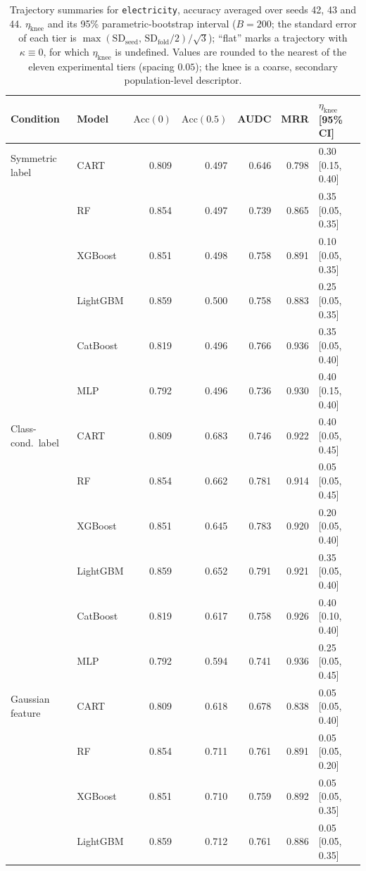 \begin{table}[p]
\centering
\scriptsize
\setlength{\tabcolsep}{3.5pt}
\caption{Trajectory summaries for \texttt{electricity}, accuracy averaged over seeds 42, 43 and 44. $\eta_{\mathrm{knee}}$ and its 95\% parametric-bootstrap interval ($B=200$; the standard error of each tier is $\max(\mathrm{SD}_{\mathrm{seed}},\,\mathrm{SD}_{\mathrm{fold}}/2)/\sqrt3$); ``flat'' marks a trajectory with $\kappa\equiv 0$, for which $\eta_{\mathrm{knee}}$ is undefined. Values are rounded to the nearest of the eleven experimental tiers (spacing $0.05$); the knee is a coarse, secondary population-level descriptor.}
\label{tab:traj_electricity}
\begin{tabular}{@{}llrrrrl@{}}
\toprule
Condition & Model & $\mathrm{Acc}(0)$ & $\mathrm{Acc}(0.5)$ & AUDC & MRR & $\eta_{\mathrm{knee}}$ [95\% CI] \\
\midrule
Symmetric label & CART & 0.809 & 0.497 & 0.646 & 0.798 & 0.30 [0.15, 0.40] \\
 & RF & 0.854 & 0.497 & 0.739 & 0.865 & 0.35 [0.05, 0.35] \\
 & XGBoost & 0.851 & 0.498 & 0.758 & 0.891 & 0.10 [0.05, 0.35] \\
 & LightGBM & 0.859 & 0.500 & 0.758 & 0.883 & 0.25 [0.05, 0.35] \\
 & CatBoost & 0.819 & 0.496 & 0.766 & 0.936 & 0.35 [0.05, 0.40] \\
 & MLP & 0.792 & 0.496 & 0.736 & 0.930 & 0.40 [0.15, 0.40] \\
\midrule
Class-cond.\ label & CART & 0.809 & 0.683 & 0.746 & 0.922 & 0.40 [0.05, 0.45] \\
 & RF & 0.854 & 0.662 & 0.781 & 0.914 & 0.05 [0.05, 0.45] \\
 & XGBoost & 0.851 & 0.645 & 0.783 & 0.920 & 0.20 [0.05, 0.40] \\
 & LightGBM & 0.859 & 0.652 & 0.791 & 0.921 & 0.35 [0.05, 0.40] \\
 & CatBoost & 0.819 & 0.617 & 0.758 & 0.926 & 0.40 [0.10, 0.40] \\
 & MLP & 0.792 & 0.594 & 0.741 & 0.936 & 0.25 [0.05, 0.45] \\
\midrule
Gaussian feature & CART & 0.809 & 0.618 & 0.678 & 0.838 & 0.05 [0.05, 0.40] \\
 & RF & 0.854 & 0.711 & 0.761 & 0.891 & 0.05 [0.05, 0.20] \\
 & XGBoost & 0.851 & 0.710 & 0.759 & 0.892 & 0.05 [0.05, 0.35] \\
 & LightGBM & 0.859 & 0.712 & 0.761 & 0.886 & 0.05 [0.05, 0.35] \\

\end{tabular}
\end{table}
